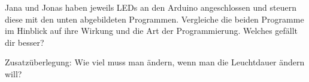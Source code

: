 \documentclass[ngerman, 11pt]{scrreprt}
\begin{document}
	\setcounter{chapter}{3}

	\begin{aufgabe*}
		Jana und Jonas haben jeweils LEDs an den Arduino angeschlossen und steuern diese mit den unten abgebildeten Programmen. Vergleiche die beiden Programme im Hinblick auf ihre Wirkung und die Art der Programmierung. Welches gefällt dir besser?
		
		Zusatzüberlegung: Wie viel muss man ändern, wenn man die Leuchtdauer ändern will?
	\end{aufgabe*}
	
\end{document}

